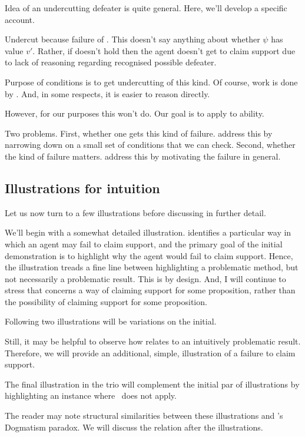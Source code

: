 \begin{note}[\eiS{}]
  Idea of an undercutting defeater is quite general.
  Here, we'll develop a specific account.

  Undercut because failure of \eiS{}.
  This doesn't say anything about whether \(\psi\) has value \(v'\).
  Rather, if \eiS{} doesn't hold then the agent doesn't get to claim support {\color{red} due to lack of reasoning regarding recognised possible defeater}.
\end{note}

\begin{note}
  Purpose of conditions is to get undercutting of this kind.
  Of course, work is done by \eiS{}.
  And, in some respects, it is easier to reason directly.

  However, for our purposes this won't do.
  Our goal is to apply \nI{} to ability.

  Two problems.
  First, whether one gets this kind of failure.
  \nI{} address this by narrowing down on a small set of conditions that we can check.
  Second, whether the kind of failure matters.
  \nI{} address this by motivating the failure in general.
\end{note}

\subsection{Illustrations for intuition}

\begin{note}
  Let us now turn to a few illustrations before discussing \nI{} in further detail.

  We'll begin with a somewhat detailed illustration.
  \nI{} identifies a particular way in which an agent may fail to claim support, and the primary goal of the initial demonstration is to highlight why the agent would fail to claim support.
  Hence, the illustration treads a fine line between highlighting a problematic method, but not necessarily a problematic result.
  This is by design.
  And, I will continue to stress that \nI{} concerns a way of claiming support for some proposition, rather than the possibility of claiming support for some proposition.

  Following two illustrations will be variations on the initial.

  Still, it may be helpful to observe how \nI{} relates to an intuitively problematic result.
  Therefore, we will provide an additional, simple, illustration of a failure to claim support.

  The final illustration in the trio will complement the initial par of illustrations by highlighting an instance where~\nI{} does not apply.

  The reader may note structural similarities between these illustrations and \citeauthor{Kripke:2011wv}'s Dogmatism paradox.
  We will discuss the relation after the illustrations.
\end{note}

